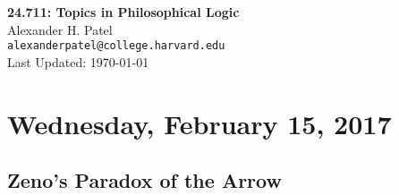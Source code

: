 \documentclass[12pt]{article}
\theoremstyle{definition}
\begin{document}
\begin{center}
\textbf{24.711: Topics in Philosophical Logic} \\
Alexander H. Patel \\
{\tt alexanderpatel@college.harvard.edu} \\
Last Updated: \today
\end{center}

\tableofcontents

\section{Wednesday, February 15, 2017}

\subsection{Zeno's Paradox of the Arrow}
\end{document}
